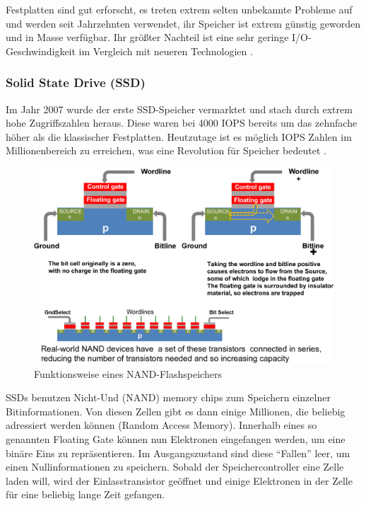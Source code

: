 Festplatten sind gut erforscht, es treten extrem selten unbekannte Probleme auf und werden seit Jahrzehnten verwendet, ihr Speicher ist extrem günstig geworden und in Masse verfügbar. Ihr größter Nachteil ist eine sehr geringe I/O-Geschwindigkeit im Vergleich mit neueren Technologien \parencite[Kap. 3]{kaufmann.2016}.

\subsubsection{Solid State Drive (SSD)}

Im Jahr 2007 wurde der erste SSD-Speicher vermarktet und stach durch extrem hohe Zugriffszahlen heraus. Diese waren bei 4000 \gls{IOPS} bereits um das zehnfache höher als die klassischer Festplatten. Heutzutage ist es möglich IOPS Zahlen im Millionenbereich zu erreichen, was eine Revolution für Speicher bedeutet \parencite[Kap. 3]{kaufmann.2016}.

\begin{figure}[hbt]
	\centering
	\includegraphics[scale=0.85]{images/flash}
	\caption{Funktionsweise eines NAND-Flashspeichers \parencite{kaufmann.2016}}
	\label{fig:flash}
\end{figure}

SSDs benutzen Nicht-Und (NAND) memory chips zum Speichern einzelner Bitinformationen. Von diesen Zellen gibt es dann einige Millionen, die beliebig adressiert werden können (Random Access Memory). Innerhalb eines so genannten Floating Gate können nun Elektronen eingefangen werden, um eine binäre Eins zu repräsentieren. Im Ausgangszustand sind diese ``Fallen'' leer, um einen Nullinformationen zu speichern. Sobald der Speichercontroller eine Zelle laden will, wird der Einlasstransistor geöffnet und einige Elektronen in der Zelle für eine beliebig lange Zeit gefangen.

